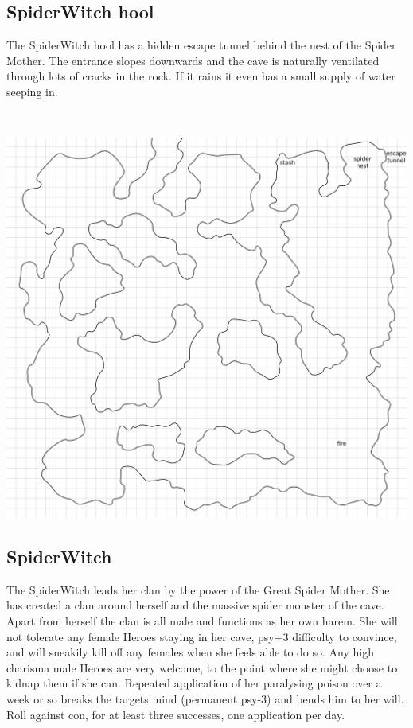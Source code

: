 \subsection*{SpiderWitch hool}

The SpiderWitch hool has a hidden escape tunnel behind the nest of the Spider Mother. The entrance slopes downwards and the cave is naturally ventilated through lots of cracks in the rock. If it rains it even has a small supply of water seeping in. 

\

\noindent
\includegraphics[width=0.999\textwidth]{./map/hool2.png}


\goodbreak 
\subsection*{SpiderWitch}
\label{spiderwitch}

The SpiderWitch leads her clan by the power of the Great Spider Mother. She has created a clan around herself and the massive spider monster of the cave. Apart from herself the clan is all male and functions as her own harem. She will not tolerate any female Heroes staying in her cave, psy+3 difficulty to convince, and will sneakily kill off any females when she feels able to do so. Any high charisma male Heroes are very welcome, to the point where she might choose to kidnap them if she can. Repeated application of her paralysing poison over a week or so breaks the targets mind (permanent psy-3) and bends him to her will. Roll against con, for at least three successes, one application per day.

